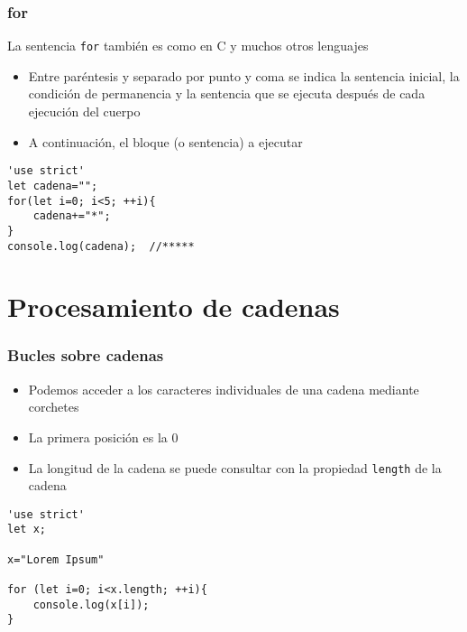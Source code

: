 \documentclass[ucs]{beamer}
\begin{document}
\begin{frame}[fragile]
\frametitle{for}
La sentencia 
\verb|for| también es como en C y muchos otros lenguajes

    \begin{itemize}
    \item
Entre paréntesis y separado por punto y coma se indica la sentencia inicial, la condición de permanencia
y la sentencia que se ejecuta después de cada ejecución del cuerpo
    \item
A continuación, el bloque (o sentencia) a ejecutar
    \end{itemize}

  \begin{scriptsize}
  \begin{verbatim}
'use strict'
let cadena="";
for(let i=0; i<5; ++i){
    cadena+="*";
}
console.log(cadena);  //*****
  \end{verbatim}
  \end{scriptsize}

\end{frame}



\section{Procesamiento de cadenas}
\begin{frame}[fragile]
\frametitle{Bucles sobre cadenas}

    \begin{itemize}
    \item
Podemos acceder a los caracteres individuales de una cadena
mediante corchetes

    \item
La primera posición es la 0

    \item
La longitud de la cadena se puede consultar con 
la propiedad 
\verb|length|
de la cadena
    \end{itemize}


  \begin{scriptsize}
  \begin{verbatim}
'use strict'
let x;

x="Lorem Ipsum"

for (let i=0; i<x.length; ++i){
    console.log(x[i]);
}

  \end{verbatim}
  \end{scriptsize}

\end{frame}
\end{document}
